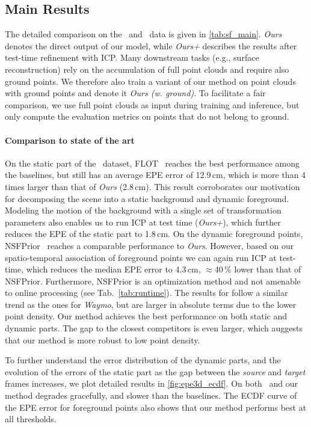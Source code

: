 \subsection{Main Results}
\label{sec:evaluation_results}
The detailed comparison on the \waymo~and \nuscenes~data is given in \cref{tab:sf_main}. \emph{Ours} denotes the direct output of our model, while \emph{Ours+} describes the results after test-time refinement with ICP. Many downstream tasks (e.g., surface reconstruction) rely on the accumulation of full point clouds and require also ground points. We therefore also train a variant of our method on point clouds with ground points and denote it \emph{Ours (w. ground)}. To facilitate a fair comparison, we use full point clouds as input during training and inference, but only compute the evaluation metrics on points that do not belong to ground. 

\paragraph{Comparison to state of the art}

On the static part of the \textbf{\waymo}~dataset, FLOT~\cite{puy2020flot} reaches the best performance among the baselines, but still has an average EPE error of 12.9$\,$cm, which is more than 4 times larger than that of \textit{Ours} (2.8$\,$cm). This result corroborates our motivation for decomposing the scene into a static background and dynamic foreground. Modeling the motion of the background with a single set of transformation parameters also enables us to run ICP at test time (\textit{Ours+}), which further reduces the EPE of the static part to 1.8$\,$cm. On the dynamic foreground points, NSFPrior~\cite{li2021neural} reaches a comparable performance to \textit{Ours}. However, based on our spatio-temporal association of foreground points we can again run ICP at test-time, which reduces the median EPE error to 4.3$\,$cm, $\approx$40$\,\%$ lower than that of NSFPrior. Furthermore, NSFPrior is an optimization method and not amenable to online processing (see Tab.~\ref{tab:runtime}). The results for \textbf{\nuscenes} follow a similar trend as the ones for \emph{Waymo}, but are larger in absolute terms due to the lower point density. Our method achieves the best performance on both static and dynamic parts. The gap to the closest competitors is even larger, which auggests that our method is more robust to low point density.

To further understand the error distribution of the dynamic parts, and the evolution of the errors of the static part as the gap between the \textit{source} and \textit{target} frames increases, we plot detailed results in \cref{fig:epe3d_ecdf}. On both \waymo~and \nuscenes{} our method degrades gracefully, and slower than the baselines. The ECDF curve of the EPE error for foreground points also shows that our method performs best at all thresholds. 


